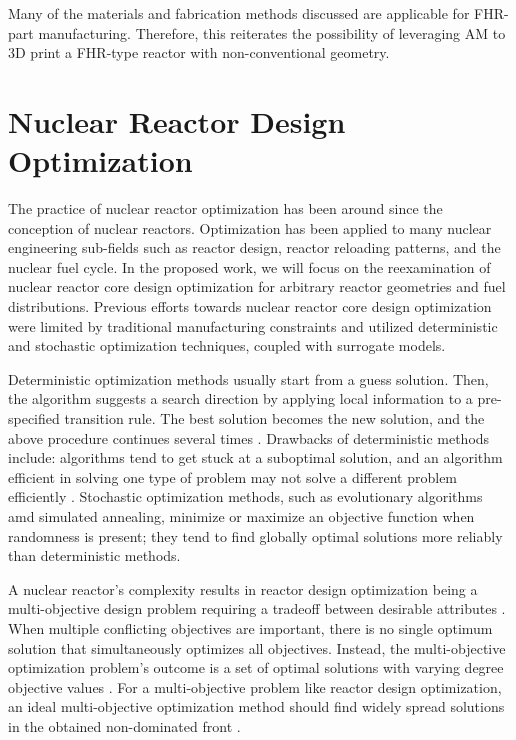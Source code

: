 Many of the materials and fabrication methods discussed are applicable 
for \gls{FHR}-part manufacturing. 
Therefore, this reiterates the possibility of leveraging \gls{AM} to 3D print a
\gls{FHR}-type reactor with non-conventional geometry. 

\section{Nuclear Reactor Design Optimization}
\label{sec:opt}
The practice of nuclear reactor optimization has been around since the 
conception of nuclear reactors. 
Optimization has been applied to many nuclear engineering sub-fields such 
as reactor design, reactor reloading patterns, and the nuclear fuel cycle.  
In the proposed work, we will focus on the reexamination of nuclear reactor core 
design optimization for arbitrary reactor geometries and fuel distributions. 
Previous efforts towards nuclear reactor core design optimization were limited by 
traditional manufacturing constraints and utilized deterministic and stochastic 
optimization techniques, coupled with surrogate models. 

Deterministic optimization methods usually start from a guess solution.
Then, the algorithm suggests a search direction by applying local 
information to a pre-specified transition rule. 
The best solution becomes the new solution, and the above procedure continues 
several times \cite{deb_multi-objective_2001}. 
Drawbacks of deterministic methods include: algorithms tend to get stuck at a 
suboptimal solution, and an algorithm efficient in solving one type of problem 
may not solve a different problem efficiently \cite{deb_multi-objective_2001}. 
Stochastic optimization methods, such as evolutionary algorithms amd simulated annealing,  
minimize or maximize an objective function when randomness is present; they 
tend to find globally optimal solutions more reliably than deterministic methods. 

A nuclear reactor's complexity results in reactor design optimization being a 
multi-objective design problem requiring a tradeoff between desirable 
attributes \cite{byrne_evolving_2014,simon_sciences_2019}. 
When multiple conflicting objectives are important, there is no single optimum 
solution that simultaneously optimizes all objectives. 
Instead, the multi-objective optimization problem's outcome is a set of optimal 
solutions with varying degree objective values \cite{deb_multi-objective_2001}. 
For a multi-objective problem like reactor design optimization, 
an ideal multi-objective optimization method should find widely spread solutions 
in the obtained non-dominated front \cite{deb_multi-objective_2001}. 

